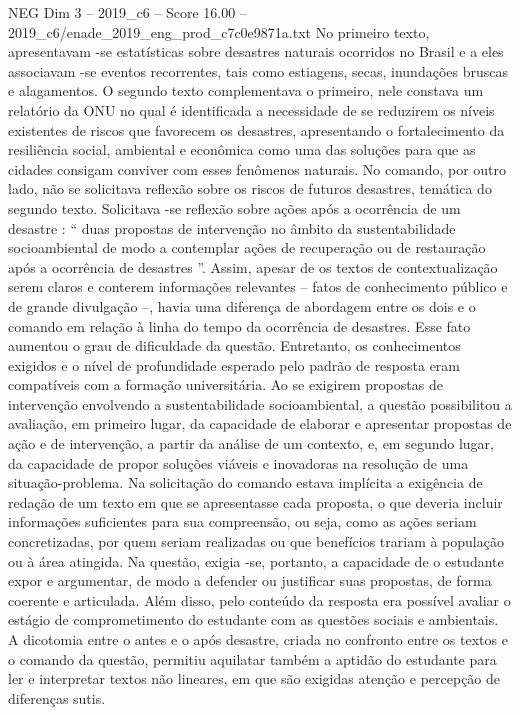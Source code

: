 \begin{textsample}{NEG Dim 3 – 2019\_c6 – Score 16.00 – 2019\_c6/enade\_2019\_eng\_prod\_c7c0e9871a.txt}
No primeiro texto, apresentavam -se estatísticas sobre desastres naturais ocorridos no Brasil e a eles associavam -se eventos recorrentes, tais como estiagens, secas, inundações bruscas e alagamentos.
O segundo texto complementava o primeiro, nele constava um relatório da ONU no qual é identificada a necessidade de se reduzirem os níveis existentes de riscos que favorecem os desastres, apresentando o fortalecimento da resiliência social, ambiental e econômica como uma das soluções para que as cidades consigam conviver com esses fenômenos naturais.
No comando, por outro lado, não se solicitava reflexão sobre os riscos de futuros desastres, temática do segundo texto.
Solicitava -se reflexão sobre ações após a ocorrência de um desastre : “ duas propostas de intervenção no âmbito da sustentabilidade socioambiental de modo a contemplar ações de recuperação ou de restauração após a ocorrência de desastres ”.
Assim, apesar de os textos de contextualização serem claros e conterem informações relevantes – fatos de conhecimento público e de grande divulgação –, havia uma diferença de abordagem entre os dois e o comando em relação à linha do tempo da ocorrência de desastres.
Esse fato aumentou o grau de dificuldade da questão.
Entretanto, os conhecimentos exigidos e o nível de profundidade esperado pelo padrão de resposta eram compatíveis com a formação universitária.
Ao se exigirem propostas de intervenção envolvendo a sustentabilidade socioambiental, a questão possibilitou a avaliação, em primeiro lugar, da capacidade de elaborar e apresentar propostas de ação e de intervenção, a partir da análise de um contexto, e, em segundo lugar, da capacidade de propor soluções viáveis e inovadoras na resolução de uma situação-problema.
Na solicitação do comando estava implícita a exigência de redação de um texto em que se apresentasse cada proposta, o que deveria incluir informações suficientes para sua compreensão, ou seja, como as ações seriam concretizadas, por quem seriam realizadas ou que benefícios trariam à população ou à área atingida.
Na questão, exigia -se, portanto, a capacidade de o estudante expor e argumentar, de modo a defender ou justificar suas propostas, de forma coerente e articulada.
Além disso, pelo conteúdo da resposta era possível avaliar o estágio de comprometimento do estudante com as questões sociais e ambientais.
A dicotomia entre o antes e o após desastre, criada no confronto entre os textos e o comando da questão, permitiu aquilatar também a aptidão do estudante para ler e interpretar textos não lineares, em que são exigidas atenção e percepção de diferenças sutis.

\end{textsample}
